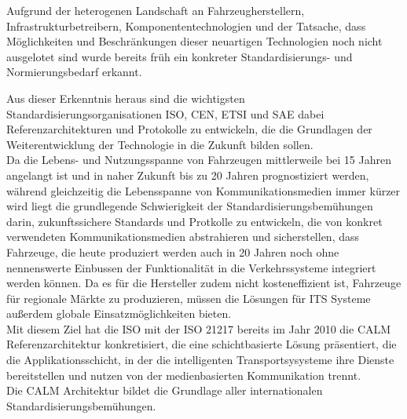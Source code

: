     Aufgrund der heterogenen Landschaft an Fahrzeugherstellern, Infrastrukturbetreibern, Komponententechnologien und der Tatsache, dass Möglichkeiten
    und Beschränkungen dieser neuartigen Technologien noch nicht ausgelotet sind wurde bereits früh ein konkreter Standardisierungs- und Normierungsbedarf erkannt.

    Aus dieser Erkenntnis heraus sind die wichtigsten Standardisierungsorganisationen ISO, CEN, ETSI und SAE dabei Referenzarchitekturen und Protokolle zu entwickeln, die
    die Grundlagen der Weiterentwicklung der Technologie in die Zukunft bilden sollen.\cite{BP11}\\
    Da die Lebens- und Nutzungsspanne von Fahrzeugen mittlerweile bei 15 Jahren angelangt ist und in naher Zukunft bis zu 20 Jahren prognostiziert werden, während gleichzeitig die 
    Lebensspanne von Kommunikationsmedien immer kürzer wird liegt die grundlegende Schwierigkeit der Standardisierungsbemühungen darin, zukunftssichere Standards und Protkolle zu entwickeln,
    die von konkret verwendeten Kommunikationsmedien abstrahieren und sicherstellen, dass Fahrzeuge, die heute produziert werden auch in 20 Jahren noch ohne nennenswerte Einbussen der Funktionalität in die Verkehrssysteme
    integriert werden können. Da es für die Hersteller zudem nicht kosteneffizient ist, Fahrzeuge für regionale Märkte zu produzieren, müssen die Lösungen für ITS Systeme
    außerdem globale Einsatzmöglichkeiten bieten.\\
    Mit diesem Ziel hat die ISO mit der ISO 21217 \cite{BP09} bereits im Jahr 2010 die CALM Referenzarchitektur konkretisiert, die eine schichtbasierte Lösung präsentiert, die die Applikationsschicht, in
    der die intelligenten Transportsysysteme ihre Dienste bereitstellen und nutzen von der medienbasierten Kommunikation trennt.\\
    Die CALM Architektur bildet die Grundlage aller internationalen Standardisierungsbemühungen.

